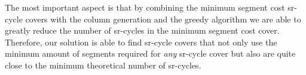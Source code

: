 The most important aspect is that by combining the minimum segment cost sr-cycle covers
with the column generation and the greedy algorithm we are able to greatly reduce the number of sr-cycles
in the minimum segment cost cover. Therefore, our solution is able to find sr-cycle covers that 
not only use the minimum amount of segments required for \emph{any} sr-cycle cover but also
are quite close to the minimum theoretical number of sr-cycles.
